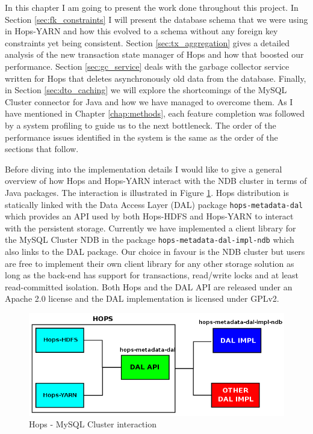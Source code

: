 In this chapter I am going to present the work done throughout this
project. In Section \ref{sec:fk_constraints} I will present the
database schema that we were using in Hops-YARN and how this evolved
to a schema without any foreign key constraints yet being
consistent. Section \ref{sec:tx_aggregation} gives a detailed analysis
of the new transaction state manager of Hops and how that boosted our
performance. Section \ref{sec:gc_service} deals with the garbage
collector service written for Hops that deletes asynchronously old
data from the database. Finally, in Section \ref{sec:dto_caching} we
will explore the shortcomings of the MySQL Cluster connector for Java and
how we have managed to overcome them. As I have mentioned in Chapter
\ref{chap:methods}, each feature completion was followed by a system
profiling to guide us to the next bottleneck. The order of the
performance issues identified in the system is the same as the order
of the sections that follow.

Before diving into the implementation details I would like to give a
general overview of how Hops and Hops-YARN interact with the NDB
cluster in terms of Java packages. The interaction is illustrated in
Figure \ref{fig:impl_hops_ndb}. Hops distribution is statically linked
with the Data Access Layer (DAL) package \texttt{hops-metadata-dal}
which provides an API used by both Hops-HDFS and Hops-YARN to interact
with the persistent storage. Currently we have implemented a client
library for the MySQL Cluster NDB in the package
\texttt{hops-metadata-dal-impl-ndb} which also links to the DAL
package. Our choice in favour is the NDB cluster but users are free to
implement their own client library for any other storage solution as
long as the back-end has support for transactions, read/write locks and
at least read-committed isolation. Both Hops and the DAL API are
released under an Apache 2.0 license and the DAL implementation is
licensed under GPLv2.

\begin{figure}
\centering
\includegraphics[scale=0.5]{resources/images/Implementation/hops_ndb_interaction.png}
\caption{Hops - MySQL Cluster interaction}
\label{fig:impl_hops_ndb}
\end{figure}
